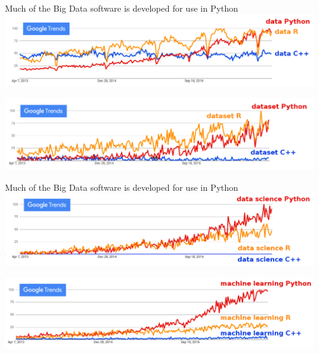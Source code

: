 \documentclass[aspectratio=169]{beamer}
\begin{document}
\begin{frame}{Much of the Big Data software is developed for use in Python}
\vspace{0.5 cm}
\includegraphics[width=\linewidth]{python-r-cpp-googletrends-data.png}

\vspace{1 cm}
\includegraphics[width=\linewidth]{python-r-cpp-googletrends-dataset.png}
\end{frame}

\begin{frame}{Much of the Big Data software is developed for use in Python}
\vspace{0.5 cm}
\includegraphics[width=\linewidth]{python-r-cpp-googletrends-datascience.png}

\vspace{1 cm}
\includegraphics[width=\linewidth]{python-r-cpp-googletrends-machinelearning.png}
\end{frame}
\end{document}
